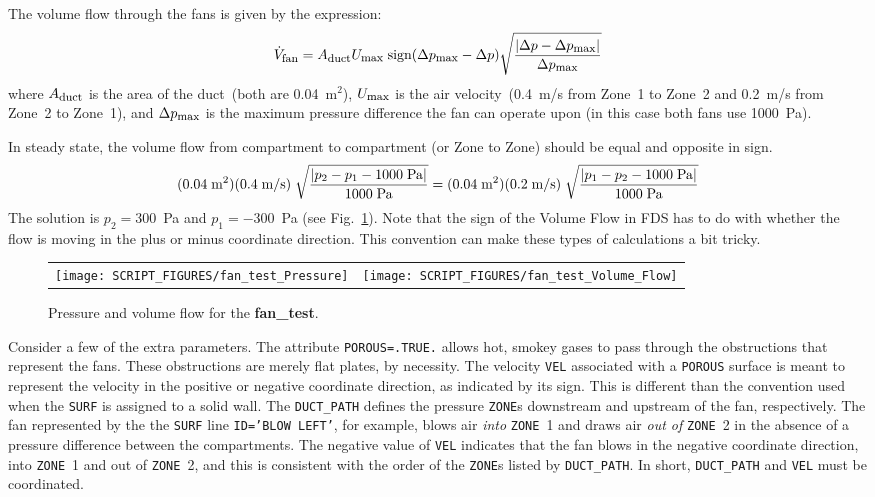 \documentclass[11pt]{book}
\newcommand{\ct}{\tt\small}
\newcommand{\be}{\begin{equation}}
\newcommand{\ee}{\end{equation}}
\begin{document}
\noindent
The volume flow through the fans is given by the expression:
\be \dot{V}_{\hbox{\footnotesize fan}} = A_{\hbox{\footnotesize duct}}
U_{\hbox{\footnotesize max}} \;
   \hbox{sign} (\Delta p_{\hbox{\footnotesize max}}-\Delta p)
   \sqrt{ \frac{ |\Delta p - \Delta p_{\hbox{\footnotesize max}}|}{\Delta p_{\hbox{\footnotesize max}} } }  \ee
where $A_{\hbox{\footnotesize duct}}$ is the area of the duct~(both are 0.04~m$^2$), $U_{\hbox{\footnotesize max}}$ is the air velocity~(0.4~m/s from
Zone~1 to Zone~2 and 0.2~m/s from Zone~2 to Zone~1), and $\Delta p_{\hbox{\footnotesize max}}$ is the maximum pressure difference the fan can operate
upon (in this case both fans use 1000~Pa).

In steady state, the volume flow from compartment to compartment (or Zone to Zone) should be equal and opposite in sign. \be (0.04 \; \hbox{m}^2)
(0.4 \; \hbox{m/s})  \;
   \sqrt{ \frac{ |p_2-p_1-1000 \; \hbox{Pa}|}{1000 \; \hbox{Pa}}  } =
   (0.04 \; \hbox{m}^2) (0.2 \; \hbox{m/s})  \;
   \sqrt{ \frac{ |p_1-p_2-1000 \; \hbox{Pa}|}{1000 \; \hbox{Pa}}  } \ee
The solution is $p_2=300$~Pa and $p_1=-300$~Pa (see Fig.~\ref{fan_test}). Note that the sign of the Volume Flow in FDS has to do with whether the flow is moving in the plus or
minus coordinate direction. This convention can make these types of calculations a bit tricky.

\begin{figure}[ht]
\begin{tabular*}{\textwidth}{lr}
\texttt{[image: SCRIPT\_FIGURES/fan\_test\_Pressure]} &
\texttt{[image: SCRIPT\_FIGURES/fan\_test\_Volume\_Flow]}
\end{tabular*}
\caption[Output of the {\bf fan\_test} example.]{Pressure and volume flow for the {\bf fan\_test}.}
\label{fan_test}
\end{figure}

Consider a few of the extra parameters. The attribute {\ct POROUS=.TRUE.} allows hot, smokey gases to pass through the
obstructions that represent the fans. These obstructions are merely
flat plates, by necessity. The velocity {\ct VEL} associated with a
{\ct POROUS} surface is meant to represent the velocity in the
positive or negative coordinate direction, as indicated by its
sign. This is different than the convention used when the {\ct SURF}
is assigned to a solid wall. The {\ct DUCT\_PATH} defines the pressure
{\ct ZONE}s downstream and upstream of the fan, respectively. The fan
represented by the the {\ct SURF} line {\ct ID='BLOW LEFT'}, for example, blows air {\em into} {\ct ZONE}~1
and draws air {\em out of} {\ct ZONE}~2 in the absence of a pressure difference between the compartments. The negative value of {\ct VEL} indicates
that the fan blows in the negative coordinate direction, into {\ct ZONE}~1 and out of {\ct ZONE}~2, and this is consistent with the order of the {\ct ZONE}s listed by {\ct DUCT\_PATH}.
In short, {\ct DUCT\_PATH} and {\ct VEL} must be coordinated.
\end{document}
